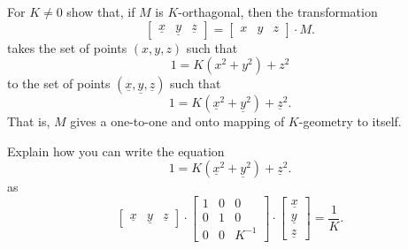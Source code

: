 \documentclass{ximera}
\begin{document}
\begin{problem}
  For $K\ne 0$ show that, if $M$ is $K$-orthagonal, then the transformation
  \[
  \begin{bmatrix}
    \underline{x} & \underline{y} & \underline{z}
  \end{bmatrix}
  =
  \begin{bmatrix}
    x & y & z
  \end{bmatrix}
  \cdot M.
  \]
  takes the set of points $\left(x,y,z\right)$ such
  that
\[
1 = K\left(x^2 + y^2\right) +z^2
\]
to the set of points
$\left(\underline{x},\underline{y},\underline{z}\right)$
such that
\[
1=K\left(\underline{x}^2 + \underline{y}^{2}\right) + \underline{z}^{2}.
\]
That is, $M$ gives a one-to-one and onto mapping of $K$-geometry to
itself.
\begin{hint}
  Explain how you can write the equation
  \[
  1=K\left(\underline{x}^2 + \underline{y}^{2}\right) + \underline{z}^{2}.
  \]
  as
\[
\begin{bmatrix}
\underline{x} & \underline{y} & \underline{z}%
\end{bmatrix}  \cdot\begin{bmatrix}
1 & 0 & 0\\
0 & 1 & 0\\
0 & 0 & K^{-1}%
\end{bmatrix}  \cdot
\begin{bmatrix}
\underline{x}\\
\underline{y}\\
\underline{z}%
\end{bmatrix}  =\frac{1}{K}.
\]
\end{hint}


\end{problem}
\end{document}
